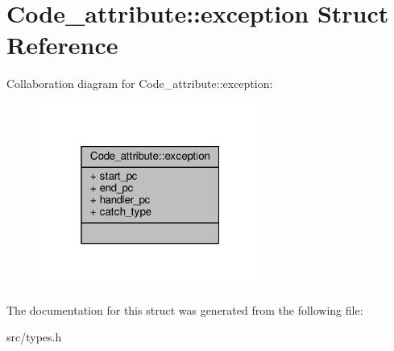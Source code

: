 \hypertarget{structCode__attribute_1_1exception}{}\section{Code\+\_\+attribute\+:\+:exception Struct Reference}
\label{structCode__attribute_1_1exception}


Collaboration diagram for Code\+\_\+attribute\+:\+:exception\+:
\nopagebreak
\begin{figure}[H]
\begin{center}
\leavevmode
\includegraphics[width=208pt]{structCode__attribute_1_1exception__coll__graph}
\end{center}
\end{figure}


The documentation for this struct was generated from the following file\+:\begin{DoxyCompactItemize}
\item 
src/types.\+h\end{DoxyCompactItemize}
